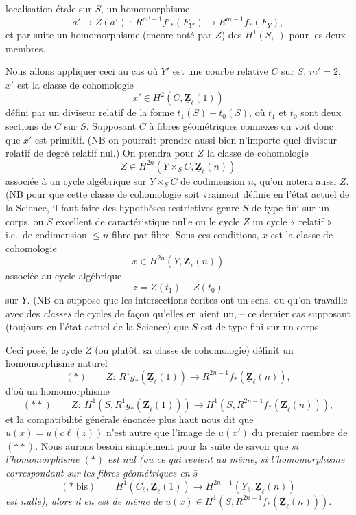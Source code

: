\documentclass[11pt,a4paper]{article}
\begin{document}


localisation étale sur $S$, un homomorphisme
\[ a' \longmapsto Z(a')\ :\ R^{m'-1} f'_{*}(F_{Y'}) \longrightarrow R^{m-1}
f_{*}(F_Y) , \]
et par suite un homomorphisme (encore noté par $Z$) des $H^1(S,\ )$ pour les deux
membres.

Nous allons appliquer ceci au cas où $Y'$ est une courbe relative $C$ sur $S$,
$m'=2$, $x'$ est la classe de cohomologie
\[ x' \in H^2(C, \underline{\mathbf{Z}}_\ell(1)) \]
défini par un diviseur relatif de la forme $t_1(S) - t_0(S)$, où $t_1$ et $t_0$
sont deux sections de $C$ sur $S$. Supposant $C$ à fibres géométriques connexes on
voit donc que $x'$ est primitif. (NB on pourrait prendre aussi bien n'importe quel
diviseur relatif de degré relatif nul.) On prendra pour $Z$ la classe de
cohomologie
\[ Z \in H^{2n}(Y \times_S C, \underline{\mathbf{Z}}_\ell(n)) \]
associée à un cycle algébrique sur $Y \times_S C$ de codimension $n$, qu'on notera
aussi $Z$. (NB pour que cette classe de cohomologie soit vraiment définie en l'état
actuel de la Science, il faut faire des hypothèses restrictives genre $S$ de type
fini sur un corps, ou $S$ excellent de caractéristique nulle ou le cycle $Z$ un
cycle « relatif » i.e.\ de codimension $\leqslant n$ fibre par fibre. Sous ces
conditions, $x$ est la classe de cohomologie
\[ x \in H^{2n}(Y, \underline{\mathbf{Z}}_\ell(n)) \]
associée au cycle algébrique
\[ z = Z(t_1) - Z(t_0) \]
sur $Y$. (NB on suppose que les intersections écrites ont un sens, ou qu'on
travaille avec des \emph{classes} de cycles de façon qu'elles en aient un, -- ce
dernier cas supposant (toujours en l'état actuel de la Science) que $S$ est de type
fini sur un corps.



Ceci posé, le cycle $Z$ (ou plutôt, sa classe de cohomologie) définit un
homomorphisme naturel
\[ (*) \qquad Z\colon\ R^1 g_{*}(\underline{\mathbf{Z}}_\ell(1)) \longrightarrow
R^{2n-1} f_{*}(\underline{\mathbf{Z}}_\ell(n)) , \]
d'où un homomorphisme
\[ (**) \qquad Z\colon\ H^1(S, R^1 g_{*}(\underline{\mathbf{Z}}_\ell(1)))
\longrightarrow H^1(S, R^{2n-1} f_{*}(\underline{\mathbf{Z}}_\ell(n))) , \]
et la compatibilité générale énoncée plus haut nous dit que $u(x) =
u(c\ell(z))$ n'est autre que l'image de $u(x')$ du premier membre de $(**)$. Nous aurons
besoin simplement pour la suite de savoir que \emph{si l'homomorphisme $(*)$ est
nul (ou ce qui revient au même, si l'homomorphisme correspondant sur les fibres
géométriques en $\bar s$}
\[ (*\ \mathrm{bis}) \qquad H^1(C_{\bar s}, \underline{\mathbf{Z}}_\ell(1))
\longrightarrow H^{2n-1}(Y_{\bar s}, \underline{\mathbf{Z}}_\ell(n)) \]
\emph{est nulle), alors il en est de même de} $u(x) \in H^1(S, R^{2n-1}
f_{*}(\underline{\mathbf{Z}}_\ell(n)))$.
\end{document}
